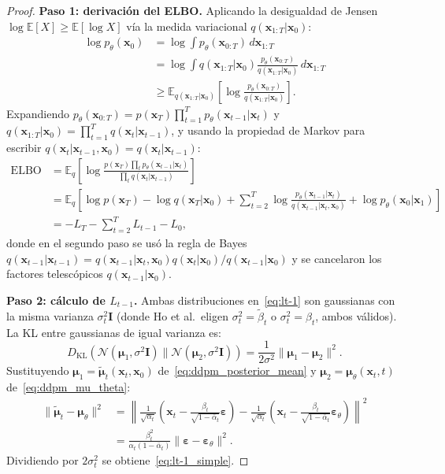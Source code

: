 \begin{proof}
\textbf{Paso 1: derivación del ELBO.}
Aplicando la desigualdad de Jensen $\log\mathbb{E}[X] \geq \mathbb{E}[\log X]$
vía la medida variacional $q(\bm{x}_{1:T}|\bm{x}_0)$:
\begin{align*}
  \log p_\theta(\bm{x}_0)
  &= \log \int p_\theta(\bm{x}_{0:T})\,d\bm{x}_{1:T}\\
  &= \log \int q(\bm{x}_{1:T}|\bm{x}_0)
    \frac{p_\theta(\bm{x}_{0:T})}{q(\bm{x}_{1:T}|\bm{x}_0)}\,d\bm{x}_{1:T}\\
  &\geq \mathbb{E}_{q(\bm{x}_{1:T}|\bm{x}_0)}\!\left[
    \log\frac{p_\theta(\bm{x}_{0:T})}{q(\bm{x}_{1:T}|\bm{x}_0)}\right].
\end{align*}
Expandiendo $p_\theta(\bm{x}_{0:T}) = p(\bm{x}_T)\prod_{t=1}^T
p_\theta(\bm{x}_{t-1}|\bm{x}_t)$ y $q(\bm{x}_{1:T}|\bm{x}_0) = \prod_{t=1}^T
q(\bm{x}_t|\bm{x}_{t-1})$, y usando la propiedad de Markov para escribir
$q(\bm{x}_t|\bm{x}_{t-1},\bm{x}_0) = q(\bm{x}_t|\bm{x}_{t-1})$:
\begin{align*}
  \text{ELBO}
  &= \mathbb{E}_q\!\left[\log\frac{p(\bm{x}_T)\prod_t p_\theta(\bm{x}_{t-1}|\bm{x}_t)}
    {\prod_t q(\bm{x}_t|\bm{x}_{t-1})}\right]\\
  &= \mathbb{E}_q\!\left[\log p(\bm{x}_T) - \log q(\bm{x}_T|\bm{x}_0)
    + \sum_{t=2}^T\log\frac{p_\theta(\bm{x}_{t-1}|\bm{x}_t)}{q(\bm{x}_{t-1}|\bm{x}_t,\bm{x}_0)}
    + \log p_\theta(\bm{x}_0|\bm{x}_1)\right]\\
  &= -L_T - \sum_{t=2}^T L_{t-1} - L_0,
\end{align*}
donde en el segundo paso se usó la regla de Bayes $q(\bm{x}_{t-1}|\bm{x}_{t-1})
= q(\bm{x}_{t-1}|\bm{x}_t,\bm{x}_0)q(\bm{x}_t|\bm{x}_0)/q(\bm{x}_{t-1}|\bm{x}_0)$
y se cancelaron los factores telescópicos $q(\bm{x}_{t-1}|\bm{x}_0)$.

\textbf{Paso 2: cálculo de $L_{t-1}$.}
Ambas distribuciones en~\eqref{eq:lt-1} son gaussianas con la misma varianza
$\sigma_t^2\bm{I}$ (donde Ho et al.\ eligen $\sigma_t^2 = \tilde{\beta}_t$ o
$\sigma_t^2 = \beta_t$, ambos válidos). La KL entre gaussianas de igual varianza
es:
\[
  D_{\mathrm{KL}}(\mathcal{N}(\bm{\mu}_1,\sigma^2\bm{I})\|\mathcal{N}(\bm{\mu}_2,\sigma^2\bm{I}))
  = \frac{1}{2\sigma^2}\|\bm{\mu}_1 - \bm{\mu}_2\|^2.
\]
Sustituyendo $\bm{\mu}_1 = \tilde{\bm{\mu}}_t(\bm{x}_t,\bm{x}_0)$ de~\eqref{eq:ddpm_posterior_mean}
y $\bm{\mu}_2 = \bm{\mu}_\theta(\bm{x}_t,t)$ de~\eqref{eq:ddpm_mu_theta}:
\begin{align*}
  \|\tilde{\bm{\mu}}_t - \bm{\mu}_\theta\|^2
  &= \left\|\frac{1}{\sqrt{\alpha_t}}\!\left(\bm{x}_t
    - \frac{\beta_t}{\sqrt{1-\bar{\alpha}_t}}\bm{\varepsilon}\right)
    - \frac{1}{\sqrt{\alpha_t}}\!\left(\bm{x}_t
    - \frac{\beta_t}{\sqrt{1-\bar{\alpha}_t}}\bm{\varepsilon}_\theta\right)\right\|^2\\
  &= \frac{\beta_t^2}{\alpha_t(1-\bar{\alpha}_t)}
    \|\bm{\varepsilon} - \bm{\varepsilon}_\theta\|^2.
\end{align*}
Dividiendo por $2\sigma_t^2$ se obtiene~\eqref{eq:lt-1_simple}.


\end{proof}
